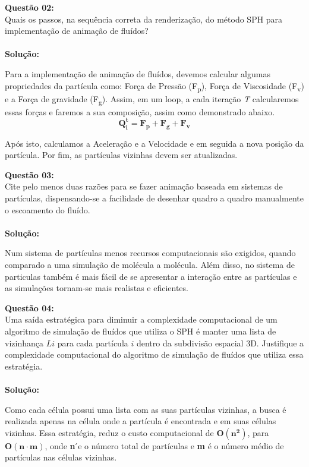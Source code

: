 \noindent\textbf{Questão 02:}\\
Quais os passos, na sequência correta da renderização, do método SPH para
implementação de animação de fluídos?\\
\\
\noindent\textbf{Solução:}

Para a implementação de animação de fluídos, devemos calcular algumas propriedades da partícula como:  Força de Pressão (F\textsubscript{p}), Força de Viscosidade (F\textsubscript{v}) e a  Força de gravidade (F\textsubscript{g}). Assim, em um loop, a cada iteração \emph{T} calcularemos essas forças e faremos a sua composição, assim como demonstrado abaixo.
\[\mathbf{Q^t_i = F_p + F_g + F_v}\]

Após isto, calculamos a Aceleração e a Velocidade e em seguida a nova posição da partícula. Por
fim, as partículas vizinhas devem ser atualizadas.
\vspace{0.5cm}

\noindent\textbf{Questão 03:}\\
Cite pelo menos duas razões para se fazer animação baseada em sistemas de
partículas, dispensando-se a facilidade de desenhar quadro a quadro manualmente
o escoamento do fluído.\\
\\
\noindent\textbf{Solução:}

Num sistema de partículas menos recursos computacionais são exigidos, quando comparado a uma simulação de molécula a molécula. Além disso, no sistema de particulas também é mais fácil de se apresentar a interação entre as partículas e as simulações tornam-se mais realistas e eficientes.
\vspace{1cm}

\noindent\textbf{Questão 04:}\\
Uma saída estratégica para diminuir a complexidade computacional de um algoritmo de
simulação de fluídos que utiliza o SPH é manter uma lista de vizinhança $Li$ para cada
partícula $i$ dentro da subdivisão espacial 3D. Justifique a complexidade computacional do
algoritmo de simulação de fluídos que utiliza essa estratégia.\\
\\
\noindent\textbf{Solução:}

Como cada célula possui uma lista com as suas partículas vizinhas, a busca é realizada apenas na célula onde a partícula é encontrada e em suas células vizinhas. Essa estratégia, reduz o custo computacional de $\mathbf{O(n^2)}$, para $\mathbf{O(n \cdot m)}$, onde \textbf{n}  ́e o número total de partículas e \textbf{m} é o número médio de partículas nas células vizinhas.
\vspace{1cm}

